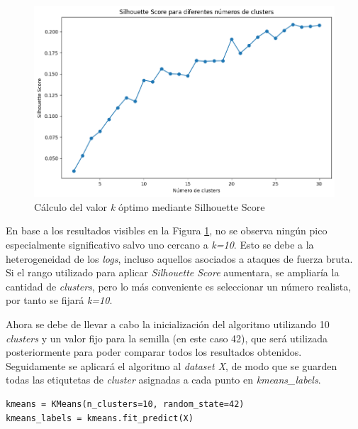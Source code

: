 

\begin{figure}[H]
    \centering
    \includegraphics[width=0.95\linewidth]{imagenes/kmeans-silhouette.png}
    \caption{Cálculo del valor \textit{k} óptimo mediante Silhouette Score}
    \label{fig:kmeans-silhouette-optimo}
\end{figure}

\newpage

En base a los resultados visibles en la Figura \ref{fig:kmeans-silhouette-optimo}, no se observa ningún pico especialmente significativo salvo uno cercano a \textit{k=10}. Esto se debe a la heterogeneidad de los \textit{logs}, incluso aquellos asociados a ataques de fuerza bruta. Si el rango utilizado para aplicar \textit{Silhouette Score} aumentara, se ampliaría la cantidad de \textit{clusters}, pero lo más conveniente es seleccionar un número realista, por tanto se fijará \textit{k=10}.

Ahora se debe de llevar a cabo la inicialización del algoritmo utilizando 10 \textit{clusters} y un valor fijo para la semilla (en este caso 42), que será utilizada posteriormente para poder comparar todos los resultados obtenidos. Seguidamente se aplicará el algoritmo al \textit{dataset X}, de modo que se guarden todas las etiqutetas de \textit{cluster} asignadas a cada punto en \textit{kmeans\_labels}. 

\begin{center}
    \begin{mdframed}
    \footnotesize
            \begin{verbatim}
kmeans = KMeans(n_clusters=10, random_state=42)
kmeans_labels = kmeans.fit_predict(X)
            \end{verbatim}
    \end{mdframed}
\end{center}


